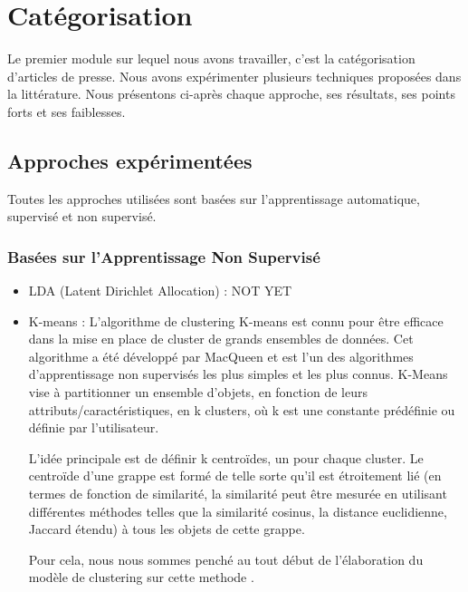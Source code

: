 \section{Catégorisation}
    Le premier module sur lequel nous avons travailler, c'est la catégorisation d'articles de presse. Nous avons expérimenter plusieurs techniques proposées dans la littérature. Nous présentons ci-après chaque approche, ses résultats, ses points forts et ses faiblesses.
    \subsection{Approches expérimentées\label{approches}}
        Toutes les approches utilisées sont basées sur l'apprentissage automatique, supervisé et non supervisé. 
        \subsubsection{Basées sur l'Apprentissage Non Supervisé}
            \begin{itemize}
                \item{LDA (Latent Dirichlet Allocation) : }
                NOT YET
                \item{K-means : }
                L'algorithme de clustering K-means est connu pour être efficace dans la mise en place de cluster de grands ensembles de données. Cet algorithme a été développé par MacQueen et est l'un des algorithmes d'apprentissage non supervisés les plus simples et les plus connus. K-Means vise à partitionner un ensemble d'objets, en fonction de leurs attributs/caractéristiques, en k clusters, où k est une constante prédéfinie ou définie par l'utilisateur. 

                L'idée principale est de définir k centroïdes, un pour chaque cluster. Le centroïde d'une grappe est formé de telle sorte qu'il est étroitement lié (en termes de fonction de similarité, la similarité peut être mesurée en utilisant différentes méthodes telles que la similarité cosinus, la distance euclidienne, Jaccard étendu) à tous les objets de cette grappe.

                Pour cela, nous nous sommes penché au tout début de l'élaboration du modèle de clustering sur cette methode \cite{methodeKmeans}.
            \end{itemize}

